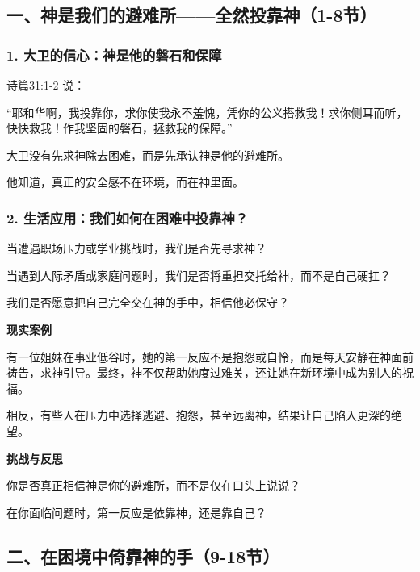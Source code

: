 \documentclass[a4paper, 12pt]{article}
\begin{document}
\subsection*{一、神是我们的避难所——全然投靠神（1-8节）}
\subsubsection*{1. 大卫的信心：神是他的磐石和保障}
\hspace{0.6cm}诗篇31:1-2 说：

“耶和华啊，我投靠你，求你使我永不羞愧，凭你的公义搭救我！求你侧耳而听，快快救我！作我坚固的磐石，拯救我的保障。”

大卫没有先求神除去困难，而是先承认神是他的避难所。

他知道，真正的安全感不在环境，而在神里面。
\subsubsection*{2. 生活应用：我们如何在困难中投靠神？}

\hspace{0.6cm}当遭遇职场压力或学业挑战时，我们是否先寻求神？

当遇到人际矛盾或家庭问题时，我们是否将重担交托给神，而不是自己硬扛？

我们是否愿意把自己完全交在神的手中，相信他必保守？

\vspace{0.2cm}

\textbf{现实案例}

\hspace{0.6cm}有一位姐妹在事业低谷时，她的第一反应不是抱怨或自怜，而是每天安静在神面前祷告，求神引导。最终，神不仅帮助她度过难关，还让她在新环境中成为别人的祝福。

\hspace{0.6cm}相反，有些人在压力中选择逃避、抱怨，甚至远离神，结果让自己陷入更深的绝望。

\vspace{0.2cm}

\textbf{挑战与反思}

\hspace{0.6cm}你是否真正相信神是你的避难所，而不是仅在口头上说说？

\hspace{0.6cm}在你面临问题时，第一反应是依靠神，还是靠自己？
\subsection*{二、在困境中倚靠神的手（9-18节）}
\end{document}
